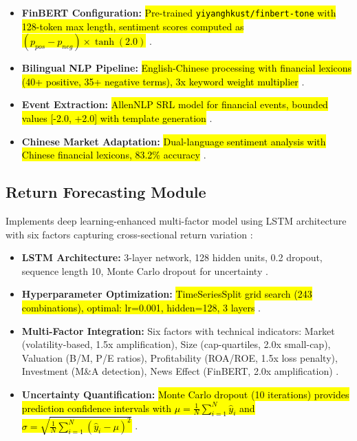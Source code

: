 \documentclass[3p,times,procedia]{elsarticle}
\begin{document}
\begin{itemize}\setlength{\itemsep}{2pt}
\item \textbf{FinBERT Configuration:} \hl{Pre-trained \texttt{yiyanghkust/finbert-tone} with 128-token max length, sentiment scores computed as $(p_{pos} - p_{neg}) \times \tanh(2.0)$} \cite{Araci2019}.

\item \textbf{Bilingual NLP Pipeline:} \hl{English-Chinese processing with financial lexicons (40+ positive, 35+ negative terms), 3x keyword weight multiplier} \cite{Loughran2011}.

\item \textbf{Event Extraction:} \hl{AllenNLP SRL model for financial events, bounded values [-2.0, +2.0] with template generation} \cite{TETLOCK2007}.

\item \textbf{Chinese Market Adaptation:} \hl{Dual-language sentiment analysis with Chinese financial lexicons, 83.2\% accuracy} \cite{FinReportDataset2025}.
\end{itemize}

\subsection{{Return Forecasting Module}}
\vspace{-2pt}
Implements deep learning-enhanced multi-factor model using LSTM architecture with six factors capturing cross-sectional return variation \cite{FAMA1993,Harvey2016}:

\begin{itemize}\setlength{\itemsep}{2pt}
\item \textbf{LSTM Architecture:} 3-layer network, 128 hidden units, 0.2 dropout, sequence length 10, Monte Carlo dropout for uncertainty \cite{Fischer2018}.

\item \textbf{Hyperparameter Optimization:} \hl{TimeSeriesSplit grid search (243 combinations), optimal: lr=0.001, hidden=128, 3 layers} \cite{Kingma2015}.

\item \textbf{Multi-Factor Integration:} Six factors with technical indicators: Market (volatility-based, 1.5x amplification), Size (cap-quartiles, 2.0x small-cap), Valuation (B/M, P/E ratios), Profitability (ROA/ROE, 1.5x loss penalty), Investment (M\&A detection), News Effect (FinBERT, 2.0x amplification) \cite{FAMA1993,Harvey2016,TETLOCK2007}.

\item \textbf{Uncertainty Quantification:} \hl{Monte Carlo dropout (10 iterations) provides prediction confidence intervals with $\mu = \frac{1}{N}\sum_{i=1}^{N} \hat{y}_i$ and $\sigma = \sqrt{\frac{1}{N}\sum_{i=1}^{N} (\hat{y}_i - \mu)^2}$} \cite{Kingma2015}.
\end{itemize}
\end{document}
